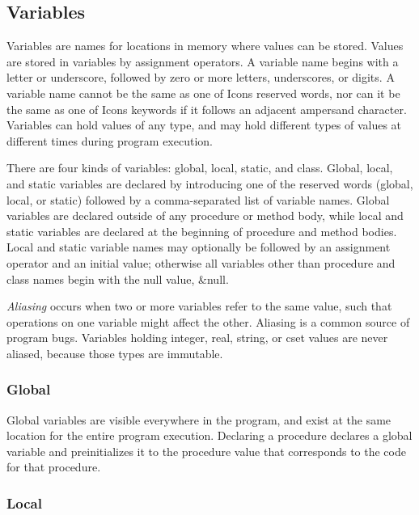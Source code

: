 \subsection{Variables}

Variables are names for locations in memory where values can be stored.
Values are stored in variables by assignment
operators. A variable name begins with a letter or
underscore, followed by zero or more letters, underscores, or digits. A
variable name cannot be the same as one of Icon{\textquotesingle}s
reserved words, nor can it be the same as one of
Icon{\textquotesingle}s keywords if it follows an adjacent ampersand
character. Variables can hold values of any type, and may hold
different types of values at different times during program execution.

There are four kinds of variables: global,
local, static, and class. Global,
local, and static variables are declared by introducing one of the
reserved words (\textsf{global}, \textsf{local}, or \textsf{static})
followed by a comma-separated list of variable names. Global variables
are declared outside of any procedure or method body, while local and
static variables are declared at the beginning of procedure and method
bodies. Local and static variable names may optionally be followed by
an assignment operator and an initial value; otherwise all variables
other than procedure and class names begin with the null value,
\textsf{\&null}.

\textit{Aliasing} occurs when two or more variables
refer to the same value, such that operations on one variable might
affect the other. Aliasing is a common source of program bugs.
Variables holding integer, real, string, or cset values are never
aliased, because those types are immutable.

\subsubsection{Global}

Global variables are visible everywhere in the program, and exist at the
same location for the entire program execution. Declaring a procedure
declares a global variable and preinitializes it to the procedure value
that corresponds to the code for that procedure.

\subsubsection{Local}

